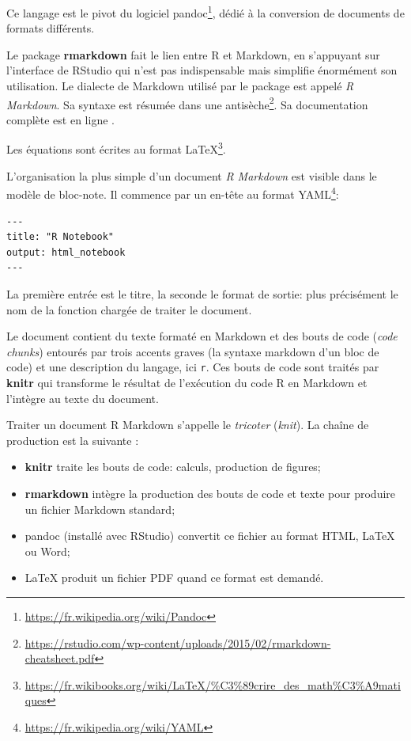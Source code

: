\documentclass[
  12pt,
  french,
  a4paper,
  extrafontsizes,onecolumn,openright
  ]{memoir}
\providecommand{\tightlist}{%
  \setlength{\itemsep}{0pt}\setlength{\parskip}{0pt}}
\newlength{\rf}
\begin{document}
Ce langage est le pivot du logiciel pandoc\footnote{\url{https://fr.wikipedia.org/wiki/Pandoc}}, dédié à la conversion de documents de formats différents.

Le package \textbf{rmarkdown} \autocite{Xie2015} fait le lien entre R et Markdown, en s'appuyant sur l'interface de RStudio qui n'est pas indispensable mais simplifie énormément son utilisation.
Le dialecte de Markdown utilisé par le package est appelé \emph{R Markdown}.
Sa syntaxe est résumée dans une antisèche\footnote{\url{https://rstudio.com/wp-content/uploads/2015/02/rmarkdown-cheatsheet.pdf}}.
Sa documentation complète est en ligne \autocite{Xie2018}.

Les équations sont écrites au format LaTeX\footnote{\url{https://fr.wikibooks.org/wiki/LaTeX/\%C3\%89crire_des_math\%C3\%A9matiques}}.

L'organisation la plus simple d'un document \emph{R Markdown} est visible dans le modèle de bloc-note.
Il commence par un en-tête au format YAML\footnote{\url{https://fr.wikipedia.org/wiki/YAML}}:

\begin{verbatim}
---
title: "R Notebook"
output: html_notebook
---
\end{verbatim}

La première entrée est le titre, la seconde le format de sortie: plus précisément le nom de la fonction chargée de traiter le document.

Le document contient du texte formaté en Markdown et des bouts de code (\emph{code chunks}) entourés par trois accents graves (la syntaxe markdown d'un bloc de code) et une description du langage, ici \texttt{r}.
Ces bouts de code sont traités par \textbf{knitr} qui transforme le résultat de l'exécution du code R en Markdown et l'intègre au texte du document.

Traiter un document R Markdown s'appelle le \emph{tricoter} (\emph{knit}).
La chaîne de production est la suivante :

\begin{itemize}
\tightlist
\item
  \textbf{knitr} traite les bouts de code: calculs, production de figures;
\item
  \textbf{rmarkdown} intègre la production des bouts de code et texte pour produire un fichier Markdown standard;
\item
  pandoc (installé avec RStudio) convertit ce fichier au format HTML, LaTeX ou Word;
\item
  LaTeX produit un fichier PDF quand ce format est demandé.
\end{itemize}
\end{document}
